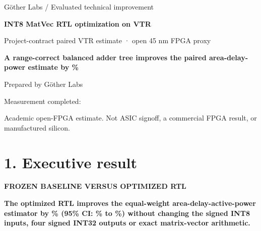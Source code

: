 \documentclass[10pt,a4paper]{article}
\newcommand{\smallcaps}[1]{\textcolor{Mid}{\fontsize{8.5}{10}\selectfont\bfseries\MakeUppercase{#1}}}
\newcommand{\newpageheading}[2]{\clearpage\section{#1}\smallcaps{#2}\vspace{6pt}}
\begin{document}
\thispagestyle{empty}
\vspace*{47mm}
{\color{Mid}\fontsize{11}{14}\selectfont Göther Labs / Evaluated technical improvement}\par
\vspace{5mm}
{\color{Ink}\fontsize{29}{33}\selectfont\bfseries INT8 MatVec RTL optimization on VTR}\par
\vspace{5mm}
{\color{Mid}\fontsize{13}{16}\selectfont Project-contract paired VTR estimate · open 45 nm FPGA proxy}\par
\vspace{19mm}
\begin{claimbox}
{\fontsize{15}{19}\selectfont\bfseries A range-correct balanced adder tree improves the paired area-delay-power estimate by \CompositeImprovement\%}
\end{claimbox}
\vspace{35mm}
{\color{Mid}\fontsize{12}{15}\selectfont Prepared by Göther Labs}\par
\vspace{4mm}
{\color{Mid}\fontsize{12}{15}\selectfont Measurement completed: \EvidenceDate}\par
\vfill
{\color{Mid}\footnotesize Academic open-FPGA estimate. Not ASIC signoff, a commercial FPGA result, or manufactured silicon.}\par

\newpageheading{1. Executive result}{Frozen baseline versus optimized RTL}

\begin{claimbox}
\textbf{The optimized RTL improves the equal-weight area-delay-active-power estimator by \CompositeImprovement\% (95\% CI: \CompositeLow\% to \CompositeHigh\%) without changing the signed INT8 inputs, four signed INT32 outputs or exact matrix-vector arithmetic.}
\end{claimbox}
\end{document}
